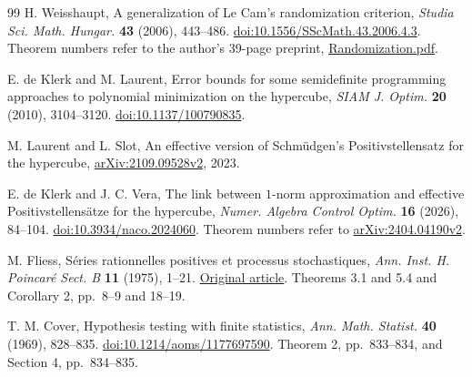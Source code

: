\begin{thebibliography}{99}
H. Weisshaupt, A generalization of Le Cam's randomization criterion,
\emph{Studia Sci. Math. Hungar.} \textbf{43} (2006), 443--486.
\href{https://doi.org/10.1556/SScMath.43.2006.4.3}{doi:10.1556/SScMath.43.2006.4.3}.
Theorem numbers refer to the author's 39-page preprint,
\href{https://www.weiszhaupt.at/publications/Randomization.pdf}{Randomization.pdf}.


E. de Klerk and M. Laurent, Error bounds for some semidefinite
programming approaches to polynomial minimization on the hypercube,
\emph{SIAM J. Optim.} \textbf{20} (2010), 3104--3120.
\href{https://doi.org/10.1137/100790835}{doi:10.1137/100790835}.


M. Laurent and L. Slot, An effective version of Schm\"udgen's
Positivstellensatz for the hypercube,
\href{https://arxiv.org/abs/2109.09528v2}{arXiv:2109.09528v2}, 2023.


E. de Klerk and J. C. Vera, The link between $1$-norm approximation
and effective Positivstellens\"atze for the hypercube,
\emph{Numer. Algebra Control Optim.} \textbf{16} (2026), 84--104.
\href{https://doi.org/10.3934/naco.2024060}{doi:10.3934/naco.2024060}.
Theorem numbers refer to
\href{https://arxiv.org/abs/2404.04190v2}{arXiv:2404.04190v2}.

M. Fliess, S\'eries rationnelles positives et processus stochastiques,
\emph{Ann. Inst. H. Poincar\'e Sect. B} \textbf{11} (1975), 1--21.
\href{https://www.numdam.org/item/AIHPB_1975__11_1_1_0/}{Original article}.
Theorems 3.1 and 5.4 and Corollary 2, pp.~8--9 and 18--19.

T. M. Cover, Hypothesis testing with finite statistics,
\emph{Ann. Math. Statist.} \textbf{40} (1969), 828--835.
\href{https://doi.org/10.1214/aoms/1177697590}{doi:10.1214/aoms/1177697590}.
Theorem 2, pp.~833--834, and Section 4, pp.~834--835.

\end{thebibliography}
